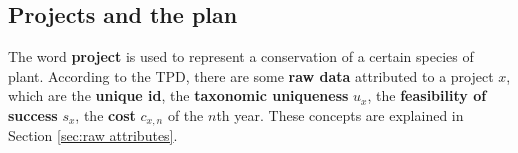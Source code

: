 \documentclass{article}
\begin{document}

\subsection{Projects and the plan}
\label{sec:projects and the plan}

The word \textbf{project} is used to represent a conservation of a certain species of plant.
According to the TPD, there are some \textbf{raw data} attributed to a project $x$, which are
the \textbf{unique id}, the \textbf{taxonomic uniqueness} $u_x$, the \textbf{feasibility of success} $s_x$, the \textbf{cost} $c_{x,n}$ of the $n$th year.
These concepts are explained in Section \ref{sec:raw attributes}.
\end{document}
